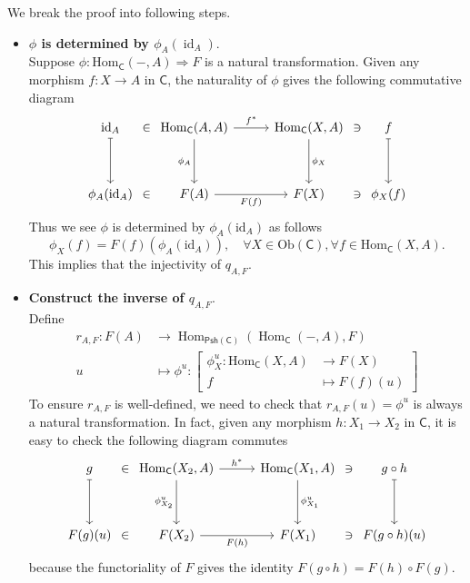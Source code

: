 \begin{prf}
    We break the proof into following steps.
\begin{itemize}[leftmargin=*]
    \item \textbf{$\phi$ is determined by $\phi_A\left(\operatorname{id}_A\right)$}.\\
    Suppose $\phi:\mathrm{Hom}_{\mathsf{C}}\left(-,A\right)\Rightarrow F$ is a natural transformation. Given any morphism $f:X\to A$ in $\mathsf{C}$, the naturality of $\phi$ gives the following commutative diagram
    \[
		\begin{tikzcd}[ampersand replacement=\&, row sep = 3.5em]
			\mathrm{id}_A\arrow[d, mapsto]\&[-25pt]\in\&[-25pt]\mathrm{Hom}_{\mathsf{C}}(A,A) \arrow[d, "{\phi_A}"']  \arrow[rr, "{f^*}"] \&[-20pt] \& {\mathrm{Hom}_{\mathsf{C}}(X,A)} \arrow[d, "\phi_X"]\&[-25pt]\ni\&[-25pt]f \arrow[d, mapsto]\\
			\phi_A(\mathrm{id}_A)\&\in\&{F(A)}\arrow[rr, "{F(f)}"'] \&  \& {F(X)}  \&\ni\& \phi_X(f)     
		\end{tikzcd}
	\]
    Thus we see $\phi$ is determined by $\phi_A(\mathrm{id}_A)$ as follows
    \[
        \phi_X(f)=F(f)(\phi_A(\mathrm{id}_A)),\quad\forall X\in \mathrm{Ob}(\mathsf{C}),\forall f\in \mathrm{Hom}_{\mathsf{C}}(X,A).
    \]
    This implies that the injectivity of $q_{A,F}$.
    \item \textbf{Construct the inverse of $q_{A,F}$}.\\
    Define 
    \begin{align*}
        r_{A,F}:  F(A)&\longrightarrow\operatorname{Hom}_{\mathsf{Psh}(\mathsf{C})}\left(\operatorname{Hom}_{\mathsf{C}}\left(-,A\right), F\right) \\
         u & \longmapsto \phi^u:\left[\begin{aligned}\phi_X^u: \mathrm{Hom}_{\mathsf{C}}(X,A)&\longrightarrow F(X)\\
             f&\longmapsto F(f)(u)\end{aligned}  \right]
    \end{align*}
    To ensure $r_{A,F}$ is well-defined, we need to check that $r_{A,F}(u)=\phi^u$ is always a natural transformation. In fact, given any morphism $h:X_1\to X_2$ in $\mathsf{C}$, it is easy to check the following diagram commutes
    \[
        \begin{tikzcd}[ampersand replacement=\&, row sep = 3.5em]
                g\arrow[mapsto]{d}\&[-25pt]\in\&[-25pt]\mathrm{Hom}_{\mathsf{C}}(X_2,A) \arrow[d, "{\phi_{X_2}^u}"']  \arrow[rr, "{h^*}"] \&[-20pt] \& {\mathrm{Hom}_{\mathsf{C}}(X_1,A)} \arrow[d, "\phi_{X_1}^u"]\&[-25pt]\ni\&[-25pt]g\circ h \arrow[mapsto]{d}\\
                F(g)(u)\&\in\&{F(X_2)}\arrow[rr, "{F(h)}"'] \&  \& {F(X_1)}  \&\ni\& F(g\circ h)(u)  
            \end{tikzcd}
    \]
    because the functoriality of $F$ gives the identity $F(g\circ h)=F(h)\circ F(g)$.


\end{itemize}
\end{prf}
